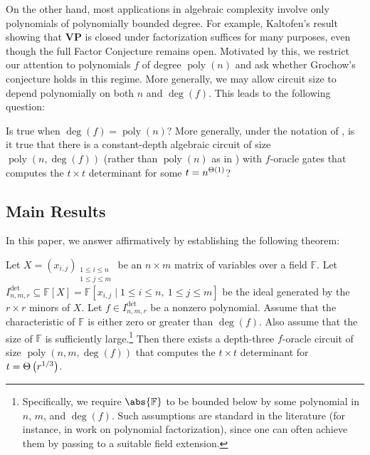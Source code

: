 \documentclass[10pt,a4paper]{amsart}
\DeclareMathOperator{\poly}{poly}
\newcommand*\F{\mathbb{F}}
\newcommand*\bigTheta[1]{%
    \Theta\kern-0.0pt\left(#1\right)
}
\begin{document}
On the other hand, most applications in algebraic complexity involve only polynomials of polynomially bounded degree.
For example, Kaltofen’s result showing that $\mathbf{VP}$ is closed under factorization suffices for many purposes, even though the full Factor Conjecture remains open.
Motivated by this, we restrict our attention to polynomials $f$ of degree $\poly(n)$ and ask whether Grochow’s conjecture holds in this regime.
More generally, we may allow circuit size to depend polynomially on both $n$ and $\deg(f)$.
This leads to the following question:
\begin{question}\label{question:main}
Is  true when $\deg(f)=\poly(n)$? 
More generally, under the notation of , is it true that there is a constant-depth algebraic circuit of size $\poly(n,\deg(f))$ (rather than $\poly(n)$ as in ) with $f$-oracle gates that computes the $t \times t$ determinant for some $t = n^{\bigTheta{1}}$?
\end{question}

\subsection{Main Results}

In this paper, we answer  affirmatively by establishing the following theorem:

\begin{thrm}\label{thrm:main}
Let $X = (x_{i,j})_{\substack{1 \leq i \leq n \\ 1 \leq j \leq m}}$ be an $n \times m$ matrix of variables over a field $\F$.
Let $I^{\det}_{n,m,r} \subseteq \F[X] = \F[x_{i,j} \mid 1 \leq i \leq n,\ 1 \leq j \leq m]$ be the ideal generated by the $r \times r$ minors of $X$.  
Let $f \in I^{\det}_{n,m,r}$ be a nonzero polynomial.  
Assume that the characteristic of $\F$ is either zero or greater than $\deg(f)$.
Also assume that the size of $\F$ is sufficiently large.\footnote{Specifically, we require $\abs{\F}$ to be bounded below by some polynomial in $n$, $m$, and $\deg(f)$.
Such assumptions are standard in the literature (for instance, in work on polynomial factorization), since one can often achieve them by passing to a suitable field extension.} 
Then there exists a depth-three $f$-oracle circuit of size $\poly(n, m, \deg(f))$ that computes the $t \times t$ determinant for $t = \bigTheta{r^{1/3}}$.
\end{thrm}
\end{document}
